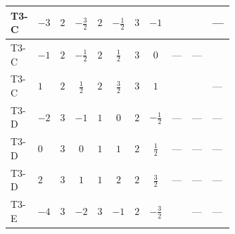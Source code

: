 \documentclass[8pt]{article}
\begin{document}
\begin{landscape}
\begin{longtable}{@{}llcccccc >{\raggedright\arraybackslash}p{0.21\linewidth} >{\raggedright\arraybackslash}p{0.21\linewidth} >{\raggedright\arraybackslash}p{0.21\linewidth}@{}}
\midrule
T3-C & $-3$ & $2$ & $-\frac{3}{2}$ & $2$ & $-\frac{1}{2}$ & $3$ & $-1$ & \scriptsize\adjustbox{max width=\linewidth}{$\begin{gathered} \frac{1}{2} (\left(\left({y_1}\right)^{T}\,\left({y_1}\right)^{*}\,{M_F}\right)_{ij}+\left({M_F}\,\left({y_2}\right)^{\dagger}\,{y_2}\right)_{ij})\end{gathered}$} & \scriptsize\adjustbox{max width=\linewidth}{$\begin{gathered} -12 {g_2}^2 \left({M_F}\right)_{ij}\end{gathered}$} & --- \\
\midrule
T3-C & $-1$ & $2$ & $-\frac{1}{2}$ & $2$ & $\frac{1}{2}$ & $3$ & $0$ & --- & --- & \scriptsize\adjustbox{max width=\linewidth}{$\begin{gathered} \frac{1}{2} (\left(\left({M_F}\right)^{T}\,\left({y_1}\right)^{\dagger}\,{y_1}\right)_{ij}+\left(\left({y_1}\right)^{T}\,\left({y_1}\right)^{*}\,{M_F}\right)_{ij}+\left(\left({M_F}\right)^{T}\,\left({y_2}\right)^{\dagger}\,{y_2}\right)_{ij}+\left(\left({y_2}\right)^{T}\,\left({y_2}\right)^{*}\,{M_F}\right)_{ij})\end{gathered}$} \\
\midrule
T3-C & $1$ & $2$ & $\frac{1}{2}$ & $2$ & $\frac{3}{2}$ & $3$ & $1$ & \scriptsize\adjustbox{max width=\linewidth}{$\begin{gathered} \frac{1}{2} (\left(\left({y_1}\right)^{T}\,\left({y_1}\right)^{*}\,{M_F}\right)_{ij}+\left({M_F}\,\left({y_2}\right)^{\dagger}\,{y_2}\right)_{ij})\end{gathered}$} & \scriptsize\adjustbox{max width=\linewidth}{$\begin{gathered} -12 {g_2}^2 \left({M_F}\right)_{ij}\end{gathered}$} & --- \\
\midrule
T3-D & $-2$ & $3$ & $-1$ & $1$ & $0$ & $2$ & $-\frac{1}{2}$ & --- & --- & --- \\
\midrule
T3-D & $0$ & $3$ & $0$ & $1$ & $1$ & $2$ & $\frac{1}{2}$ & --- & --- & --- \\
\midrule
T3-D & $2$ & $3$ & $1$ & $1$ & $2$ & $2$ & $\frac{3}{2}$ & --- & --- & --- \\
\midrule
T3-E & $-4$ & $3$ & $-2$ & $3$ & $-1$ & $2$ & $-\frac{3}{2}$ & \scriptsize\adjustbox{max width=\linewidth}{$\begin{gathered} \frac{3}{4} (\left(\left({y_1}\right)^{T}\,\left({y_1}\right)^{*}\,{M_F}\right)_{ij}+\left({M_F}\,\left({y_2}\right)^{\dagger}\,{y_2}\right)_{ij})\end{gathered}$} & --- & --- \\

\end{longtable}
\end{landscape}
\end{document}
